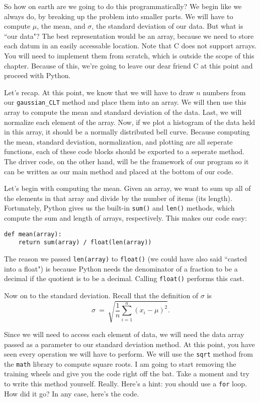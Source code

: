 \documentclass[a4paper]{article}
\begin{document}
So how on earth are we going to do this programmatically? We begin like we always do, by breaking up the problem into smaller parts. We will have to compute $\mu$, the mean, and $\sigma$, the standard deviation of our data. But what is ``our data"? The best representation would be an array, because we need to store each datum in an easily accessable location. Note that C does not support arrays. You will need to implement them from scratch, which is outside the scope of this chapter. Because of this, we're going to leave our dear friend C at this point and proceed with Python.

Let's recap. At this point, we know that we will have to draw $n$ numbers from our \texttt{gaussian\_CLT} method and place them into an array. We will then use this array to compute the mean and standard deviation of the data. Last, we will normalize each element of the array. Now, if we plot a histogram of the data held in this array, it should be a normally distributed bell curve. Because computing the mean, standard deviation, normalization, and plotting are all seperate functions, each of these code blocks should be exported to a seperate method. The driver code, on the other hand, will be the framework of our program so it can be written as our main method and placed at the bottom of our code.

Let's begin with computing the mean. Given an array, we want to sum up all of the elements in that array and divide by the number of items (its length). Fortunately, Python gives us the built-in \texttt{sum()} and \texttt{len()} methods, which compute the sum and length of arrays, respectively. This makes our code easy:

\begin{verbatim}
def mean(array):
    return sum(array) / float(len(array))
\end{verbatim}

The reason we passed \texttt{len(array)} to \texttt{float()} (we could have also said ``casted into a float") is because Python needs the denominator of a fraction to be a decimal if the quotient is to be a decimal. Calling \texttt{float()} performs this cast.

Now on to the standard deviation. Recall that the definition of $\sigma$ is
\[\sigma\ =\ \sqrt{\frac{1}{n}\sum_{i=1}^n (x_i - \mu)^2}.\]

Since \task we will need to access each element of data, we will need the data array passed as a parameter to our standard deviation method. At this point, you have seen every operation we will have to perform. We will use the \texttt{sqrt} method from the \texttt{math} library to compute square roots. I am going to start removing the training wheels and give you the code right off the bat. Take a moment and try to write this method yourself. Really. Here's a hint: you should use a \texttt{for} loop. How did it go? In any case, here's the code.
\end{document}
